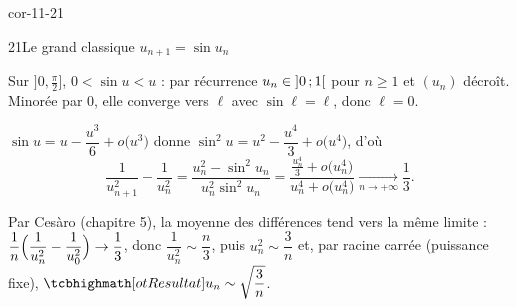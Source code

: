 \begin{blocLivre}{cor-11-21}
\begin{corrige}{21}{Le grand classique $u_{n+1}=\sin u_n$}
\begin{questions}
  \item Sur $\bigl]0,\frac{\pi}{2}\bigr]$, $0<\sin u<u$ : par récurrence
    $u_n\in\mathopen{]}0\,{;}\,1\mathclose{[}$ pour $n\geqslant1$ et $(u_n)$ décroît. Minorée par
    $0$, elle converge vers $\ell$ avec $\sin\ell=\ell$, donc $\ell=0$.
  \item $\sin u=u-\dfrac{u^{3}}{6}+o\bigl(u^{3}\bigr)$ donne
    $\sin^{2}u=u^{2}-\dfrac{u^{4}}{3}+o\bigl(u^{4}\bigr)$, d'où
    \[
    \frac{1}{u_{n+1}^{2}}-\frac{1}{u_n^{2}}
    =\frac{u_n^{2}-\sin^{2}u_n}{u_n^{2}\sin^{2}u_n}
    =\frac{\frac{u_n^{4}}{3}+o\bigl(u_n^{4}\bigr)}{u_n^{4}+o\bigl(u_n^{4}\bigr)}
    \xrightarrow[n\to+\infty]{}\frac13 .
    \]
  \item Par Cesàro (chapitre 5), la moyenne des différences tend vers la
    même limite :
    $\dfrac{1}{n}\Bigl(\dfrac{1}{u_n^{2}}-\dfrac{1}{u_0^{2}}\Bigr)\to\dfrac13$,
    donc $\dfrac{1}{u_n^{2}}\sim\dfrac{n}{3}$, puis $u_n^{2}\sim\dfrac3n$ et,
    par racine carrée (puissance fixe),
    $\res{u_n\sim\sqrt{\dfrac3n}}$.
\end{questions}
\end{corrige}
\end{blocLivre}

